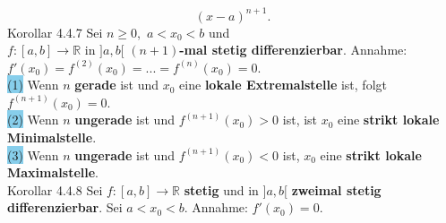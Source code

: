 \documentclass[landscape, 10pt]{article}
\newcommand{\R}{\mathbb{R}}
\begin{document}
\begin{multicols}{3}
\begin{equation*}
                            (x-a)^{n+1}.
                     \end{equation*}
              \colorbox{BurntOrange}{Korollar 4.4.7} 
                     Sei \textcolor{NavyBlue}{
                     $n\geqslant0$},\,
                     \textcolor{NavyBlue}{$a<x_0<b$} und \\
                     \textcolor{NavyBlue}
                     {$f:[a,b]\longrightarrow\R$} 
                     in \textcolor{NavyBlue}{$]a,b[$} 
                     \textbf{$(n+1)$-mal stetig 
                     differenzierbar}.
                     Annahme: \textcolor{NavyBlue}{
                     $f'(x_0)=f^{(2)}(x_0)=...
                     =f^{(n)}(x_0)=0$}. \\
                     \colorbox{SkyBlue}{(1)} 
                            Wenn \textcolor{NavyBlue}{$n$} 
                            \textbf{gerade} 
                            ist und 
                            \textcolor{NavyBlue}{$x_0$} eine 
                            \textbf{lokale Extremalstelle} 
                            ist, folgt
                            \textcolor{NavyBlue}{
                            $f^{(n+1)}(x_0)=0$}. \\
                     \colorbox{SkyBlue}{(2)} 
                            Wenn \textcolor{NavyBlue}{$n$} 
                            \textbf{ungerade} ist und 
                            \textcolor{NavyBlue}{
                            $f^{(n+1)}(x_0)>0$} ist, ist 
                            \textcolor{NavyBlue}{$x_0$} 
                            eine \textbf{strikt lokale 
                            Minimalstelle}. \\
                     \colorbox{SkyBlue}{(3)} 
                            Wenn \textcolor{NavyBlue}{$n$} 
                            \textbf{ungerade} 
                            ist und \textcolor{NavyBlue}{
                            $f^{(n+1)}(x_0)<0$} ist,
                            \textcolor{NavyBlue}{$x_0$} eine 
                            \textbf{strikt lokale 
                            Maximalstelle}. \\
              \colorbox{BurntOrange}{Korollar 4.4.8} 
                     Sei \textcolor{NavyBlue}{
                     $f:[a,b]\longrightarrow\R$} 
                     \textbf{stetig} und in 
                     \textcolor{NavyBlue}{$]a,b[$}
                     \textbf{zweimal stetig 
                     differenzierbar}. Sei 
                     \textcolor{NavyBlue}{$a<x_0<b$}. 
                     Annahme: \textcolor{NavyBlue}{$f'(x_0)=0$}.\\

\end{multicols}
\end{document}
